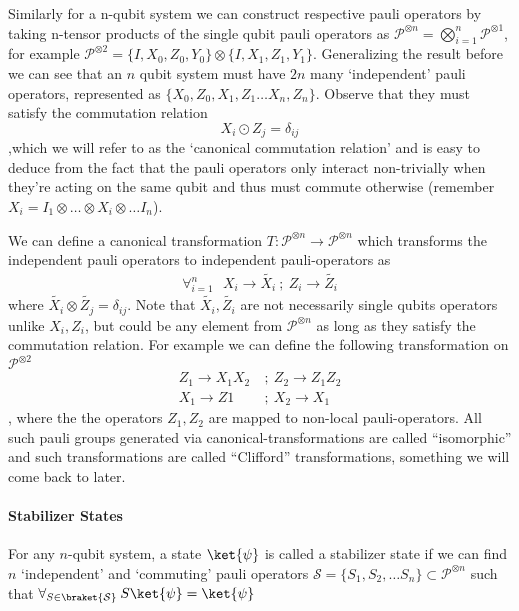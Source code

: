 \documentclass[
]{article}
\begin{document}
Similarly for a n-qubit system we can construct respective pauli
operators by taking n-tensor products of the single qubit pauli
operators as
\(\mathcal{P}^{\otimes n} = \bigotimes_{i=1}^{n}\mathcal{P}^{\otimes 1}\),
for example
\(\mathcal{P}^{\otimes2}=\{I, X_{0}, Z_{0},Y_{0}\}\otimes \{I, X_{1}, Z_{1}, Y_{1}\}\).
Generalizing the result before we can see that an \(n\) qubit system
must have \(2n\) many `independent' pauli operators, represented as
\(\{X_{0}, Z_{0}, X_{1}, Z_{1} \dots X_{n}, Z_{n}\}\). Observe that they
must satisfy the commutation relation
\[X_{i} \odot Z_{j}= \delta_{ij}\],which we will refer to as the
`canonical commutation relation' and is easy to deduce from the fact
that the pauli operators only interact non-trivially when they're acting
on the same qubit and thus must commute otherwise (remember
\(X_{i}= I_1 \otimes \dots \otimes X_{i} \otimes \dots I_n\)).

We can define a canonical transformation
\(T: \mathcal{P}^{\otimes n} \to \mathcal{P}^{\otimes n}\) which
transforms the independent pauli operators to independent
pauli-operators as
\[\begin{align} \forall_{i=1}^{n} \:\:\: X_{i} \to \tilde{X_{i}}\:; \: Z_{i}\to \tilde{Z_i}\end{align}\]
where \(\tilde{X_{i}} \otimes \tilde{Z_{j}} = \delta_{ij}\). Note that
\(\tilde{X_{i}}, \tilde{Z_{i}}\) are not necessarily single qubits
operators unlike \(X_{i}, Z_{i}\), but could be any element from
\(\mathcal{P}^{\otimes n}\) as long as they satisfy the commutation
relation. For example we can define the following transformation on
\(\mathcal{P}^{\otimes 2}\)
\[\begin{align} Z_{1} \to X_{1}X_{2} \:&;\: Z_{2}\to Z_{1}Z_{2} \\ X_{1} \to Z1 \:&; \: X_{2} \to X_1 \end{align}\],
where the the operators \(Z_{1}, Z_{2}\) are mapped to non-local
pauli-operators. All such pauli groups generated via
canonical-transformations are called ``isomorphic'' and such
transformations are called ``Clifford'' transformations, something we
will come back to later.

\hypertarget{stabilizer-states}{%
\paragraph{Stabilizer States}\label{stabilizer-states}}

For any \(n\)-qubit system, a state \(\ket{\psi}\) is called a
stabilizer state if we can find \(n\) `independent' and `commuting'
pauli operators
\(\mathcal{S} = \{S_{1}, S_{2}, \dots S_{n}\} \subset \mathcal{P}^{\otimes n}\)
such that
\(\forall_{S \in \braket{\mathcal{S}}} \: S \ket{\psi} = \ket{\psi}\)
\end{document}
